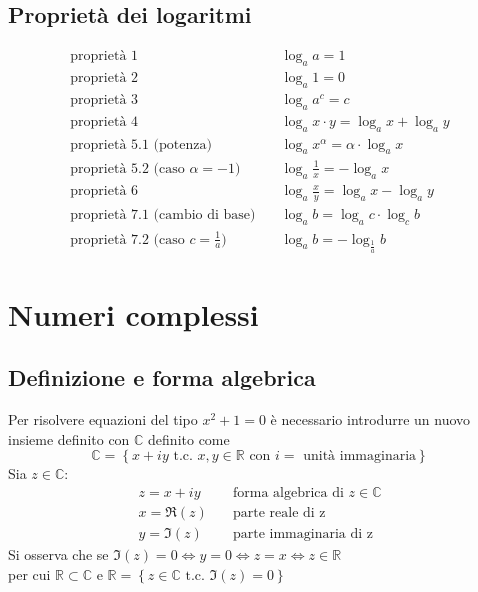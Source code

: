 \documentclass[a4paper]{article}
\begin{document}
\subsection{Proprietà dei logaritmi}
\begin{align*}
	\text{proprietà 1} \quad & \log_a a = 1 \\
	\text{proprietà 2} \quad & \log_a 1 = 0 \\
	\text{proprietà 3} \quad & \log_a a^c = c \\
	\text{proprietà 4} \quad & \log_a x \cdot y = \log_a x + \log_a y \\
	\text{proprietà 5.1 (potenza)} \quad & \log_a x^\alpha = \alpha \cdot \log_a x\\
	\text{proprietà 5.2 (caso \(\alpha = -1\))} \quad & \log_a \frac{1}{x} = - \log_a x \\
	\text{proprietà 6} \quad & \log_a \frac{x}{y} = \log_a x - \log_a y\\
	\text{proprietà 7.1 (cambio di base)} \quad & \log_a b = \log_a c \cdot \log_c b \\
	\text{proprietà 7.2 (caso \(c = \frac{1}{a}\))} \quad & \log_a b = - \log_\frac{1}{a} b
\end{align*}

\newpage

\section{Numeri complessi}
\subsection{Definizione e forma algebrica}
Per risolvere equazioni del tipo \(x^2 + 1  = 0\) è necessario introdurre un nuovo insieme definito con \(\mathbb{C}\) definito come
\[\mathbb{C} = \left\{ x + i y \text{ t.c. } x,y \in \mathbb{R} \text{ con \(i =\) unità immaginaria} \right\}\]
Sia \(z \in \mathbb{C}\):
\begin{align*}
	z = x + i y \quad & \text{forma algebrica di \(z \in \mathbb{C}\)} \\
	x = \Re(z) \quad & \text{parte reale di z} \\
	y = \Im(z) \quad & \text{parte immaginaria di z}
\end{align*}
Si osserva che se \(\Im(z) = 0 \Leftrightarrow y = 0 \Leftrightarrow z = x \Leftrightarrow z \in \mathbb{R}\) \\
per cui \(\mathbb{R} \subset \mathbb{C}\) e \(\mathbb{R} = \left\{ z \in \mathbb{C} \text{ t.c. } \Im(z) = 0 \right\}\)
\end{document}

